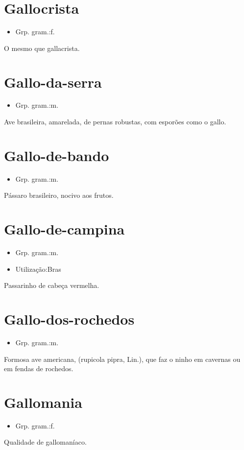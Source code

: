 \section{Gallocrista}
\begin{itemize}
\item {Grp. gram.:f.}
\end{itemize}
O mesmo que \textunderscore gallacrista\textunderscore .
\section{Gallo-da-serra}
\begin{itemize}
\item {Grp. gram.:m.}
\end{itemize}
Ave brasileira, amarelada, de pernas robustas, com esporões como o gallo.
\section{Gallo-de-bando}
\begin{itemize}
\item {Grp. gram.:m.}
\end{itemize}
Pássaro brasileiro, nocivo aos frutos.
\section{Gallo-de-campina}
\begin{itemize}
\item {Grp. gram.:m.}
\end{itemize}
\begin{itemize}
\item {Utilização:Bras}
\end{itemize}
Passarinho de cabeça vermelha.
\section{Gallo-dos-rochedos}
\begin{itemize}
\item {Grp. gram.:m.}
\end{itemize}
Formosa ave americana, (\textunderscore rupicola pipra\textunderscore , Lin.), que faz o ninho em cavernas ou em fendas de rochedos.
\section{Gallomania}
\begin{itemize}
\item {Grp. gram.:f.}
\end{itemize}
Qualidade de gallomaníaco.
